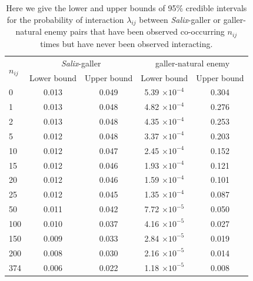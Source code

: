 \documentclass[12pt]{article}
\begin{document}
      \begin{table}[h!]
        \caption{Here we give the lower and upper bounds of 95\% credible intervals for the probability of interaction $\lambda_{ij}$ between \emph{Salix}-galler or galler-natural enemy pairs that have been observed co-occurring $n_{ij}$ times but have never been observed interacting.}
        \label{credints}
        \begin{tabular}{l  c c  c c }
        \multirow{2}{*}{$n_{ij}$} & \multicolumn{2}{c}{\emph{Salix}-galler} & \multicolumn{2}{c}{galler-natural enemy}\\
         & Lower bound & Upper bound & Lower bound & Upper bound \\
        \hline
        0   & 0.013 & 0.049 & 5.39 $\times10^{-4}$ & 0.304 \\
        1   & 0.013 & 0.048 & 4.82 $\times10^{-4}$ & 0.276 \\
        2   & 0.013 & 0.048 & 4.35 $\times10^{-4}$ & 0.253 \\
        5   & 0.012 & 0.048 & 3.37 $\times10^{-4}$ & 0.203 \\
        10  & 0.012 & 0.047 & 2.45 $\times10^{-4}$ & 0.152 \\
        15  & 0.012 & 0.046 & 1.93 $\times10^{-4}$ & 0.121 \\
        20  & 0.012 & 0.046 & 1.59 $\times10^{-4}$ & 0.101 \\
        25  & 0.012 & 0.045 & 1.35 $\times10^{-4}$ & 0.087 \\
        50  & 0.011 & 0.042 & 7.72 $\times10^{-5}$ & 0.050 \\
        100 & 0.010 & 0.037 & 4.16 $\times10^{-5}$ & 0.027 \\
        150 & 0.009 & 0.033 & 2.84 $\times10^{-5}$ & 0.019 \\
        200 & 0.008 & 0.030 & 2.16 $\times10^{-5}$ & 0.014 \\
        \hline
        374 & 0.006 & 0.022 & 1.18 $\times10^{-5}$ & 0.008 \\
        \hline
        \end{tabular}
      \end{table}

\clearpage



 

\end{document}
